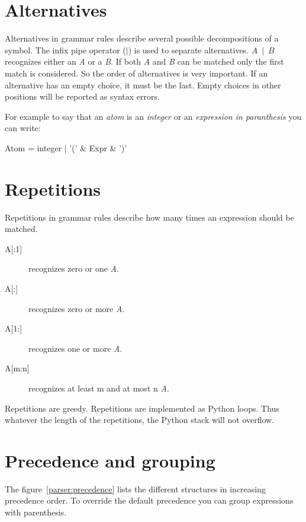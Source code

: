 \section{Alternatives}                                          \label{parser:alternatives}

Alternatives in grammar rules describe several possible decompositions of a symbol.
The infix pipe operator (\emph{$\mid$}) is used to separate alternatives.
\emph{$A~\mid~B$} recognizes either an \emph{A} or a \emph{B}.
If both \emph{A} and \emph{B} can be matched only the first match is considered.
So the order of alternatives is very important.
If an alternative has an empty choice, it must be the last.
Empty choices in other positions will be reported as syntax errors.

For example to say that an \emph{atom} is an \emph{integer} or an \emph{expression in paranthesis}
you can write:
\begin{verbatimtab}[4]
    Atom = integer | '(' & Expr & ')'
\end{verbatimtab}

\section{Repetitions}                                           \label{parser:repetitions}

Repetitions in grammar rules describe how many times an expression should be matched.

\begin{description}
    \item [{A[:1]}] recognizes zero or one \emph{A}.
    \item [{A[:]}] recognizes zero or more \emph{A}.
    \item [{A[1:]}] recognizes one or more \emph{A}.
    \item [{A[m:n]}] recognizes at least m and at most n \emph{A}.
\end{description}

Repetitions are greedy.
Repetitions are implemented as Python loops.
Thus whatever the length of the repetitions, the Python stack will not overflow. 

\section{Precedence and grouping}

The figure~\ref{parser:precedence} lists the different structures in increasing precedence order.
To override the default precedence you can group expressions with parenthesis.

